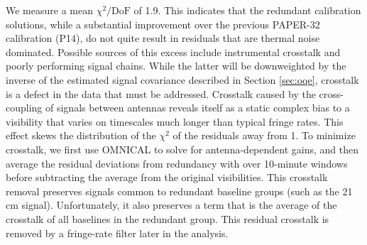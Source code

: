 \documentclass[twocolumn,numberedappendix]{emulateapj} \shorttitle{New Limits on the 21 cm Power Spectrum at $z=8.4$}
\begin{document}
We measure a mean $\chi^{2}/\text{DoF}$ of 1.9.  This
indicates that the redundant calibration solutions, while a substantial improvement
over the previous PAPER-32 calibration (P14), do not quite result in residuals that are thermal noise dominated.
Possible sources of this excess include instrumental crosstalk and poorly performing signal chains.
While the latter will be downweighted by the inverse of the estimated signal covariance described
in Section \ref{sec:oqe}, crosstalk is a defect in the data that must be addressed.
Crosstalk caused by the cross-coupling of signals between antennas
reveals itself as a static complex bias to a
visibility that varies on timescales much longer than typical fringe rates.
This effect 
skews the distribution of the $\chi^2$ of the residuals away from 1.
To minimize crosstalk, we first use OMNICAL to solve for antenna-dependent gains,
and then average the residual deviations from redundancy with
over 10-minute windows before subtracting
the average from the original visibilities. This
crosstalk removal preserves signals common to redundant baseline groups (such as the 21 cm signal).
Unfortunately, it also preserves a term that is the average of the crosstalk of all baselines
in the redundant group.  This residual crosstalk is removed by a fringe-rate filter later
in the analysis.
\end{document}
